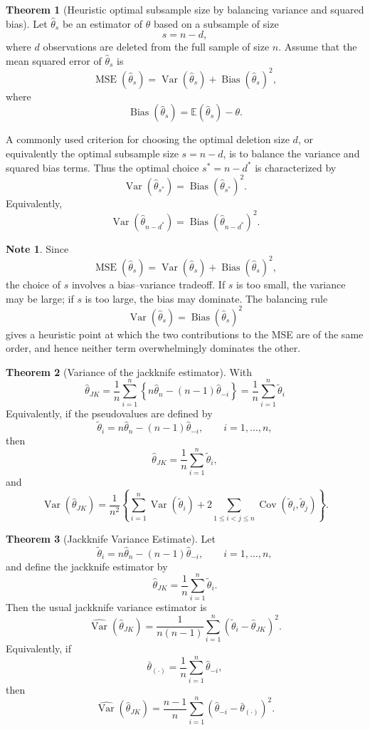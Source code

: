 \documentclass[11pt]{article}
\theoremstyle{definition}
\newtheorem{note}{Note}[section]
\newtheorem{theo}{Theorem}[section]
\begin{document}
\begin{theo}[Heuristic optimal subsample size by balancing variance and squared bias]
Let \(\hat{\theta}_s\) be an estimator of \(\theta\) based on a subsample of size
\[
s=n-d,
\]
where \(d\) observations are deleted from the full sample of size \(n\). Assume that the mean squared error of \(\hat{\theta}_s\) is
\[
\operatorname{MSE}(\hat{\theta}_s)
=
\operatorname{Var}(\hat{\theta}_s)
+
\operatorname{Bias}(\hat{\theta}_s)^2,
\]
where
\[
\operatorname{Bias}(\hat{\theta}_s)
=
\mathbb{E}(\hat{\theta}_s)-\theta.
\]

A commonly used criterion for choosing the optimal deletion size \(d\), or equivalently the optimal subsample size \(s=n-d\), is to balance the variance and squared bias terms. Thus the optimal choice \(s^\ast=n-d^\ast\) is characterized by
\[
\operatorname{Var}(\hat{\theta}_{s^\ast})
=
\operatorname{Bias}(\hat{\theta}_{s^\ast})^2.
\]
Equivalently,
\[
\operatorname{Var}(\hat{\theta}_{n-d^\ast})
=
\operatorname{Bias}(\hat{\theta}_{n-d^\ast})^2.
\]
\end{theo}

\begin{note}
Since
\[
\operatorname{MSE}(\hat{\theta}_s)
=
\operatorname{Var}(\hat{\theta}_s)
+
\operatorname{Bias}(\hat{\theta}_s)^2,
\]
the choice of \(s\) involves a bias--variance tradeoff. If \(s\) is too small, the variance may be large; if \(s\) is too large, the bias may dominate. The balancing rule
\[
\operatorname{Var}(\hat{\theta}_s)
=
\operatorname{Bias}(\hat{\theta}_s)^2
\]
gives a heuristic point at which the two contributions to the MSE are of the same order, and hence neither term overwhelmingly dominates the other.
\end{note}
\begin{theo}[Variance of the jackknife estimator]
With
\[
\hat\theta_{JK}
=
\frac{1}{n}\sum_{i=1}^n \left\{n\hat\theta_n-(n-1)\hat\theta_{-i}\right\}
=
\frac{1}{n}\sum_{i=1}^n \tilde{\theta}_i
\]
Equivalently, if the pseudovalues are defined by
\[
\tilde\theta_i
=
n\hat\theta_n-(n-1)\hat\theta_{-i},
\qquad i=1,\dots,n,
\]
then
\[
\hat\theta_{JK}
=
\frac{1}{n}\sum_{i=1}^n \tilde\theta_i,
\]
and
\[
\operatorname{Var}(\hat\theta_{JK})
=
\frac{1}{n^2}
\left\{
\sum_{i=1}^n \operatorname{Var}(\tilde\theta_i)
+
2\sum_{1\le i<j\le n}\operatorname{Cov}(\tilde\theta_i,\tilde\theta_j)
\right\}.
\]
\end{theo}

\begin{theo}[Jackknife Variance Estimate]
Let
\[
\tilde\theta_i=n\hat\theta_n-(n-1)\hat\theta_{-i},
\qquad i=1,\dots,n,
\]
and define the jackknife estimator by
\[
\hat\theta_{JK}=\frac1n\sum_{i=1}^n \tilde\theta_i.
\]
Then the usual jackknife variance estimator is
\[
\widehat{\operatorname{Var}}(\hat\theta_{JK})
=
\frac{1}{n(n-1)}
\sum_{i=1}^n
(\tilde\theta_i-\hat\theta_{JK})^2.
\]
Equivalently, if
\[
\bar\theta_{(\cdot)}=\frac1n\sum_{i=1}^n \hat\theta_{-i},
\]
then
\[
\widehat{\operatorname{Var}}(\hat\theta_{JK})
=
\frac{n-1}{n}
\sum_{i=1}^n
(\hat\theta_{-i}-\bar\theta_{(\cdot)})^2.
\]
\end{theo}
\end{document}
